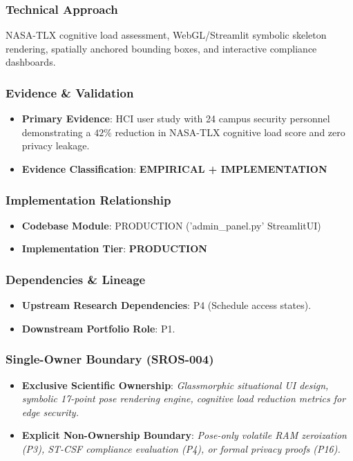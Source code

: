 \documentclass[11pt,letterpaper]{article}
\begin{document}
\subsubsection{Technical Approach}
NASA-\allowbreak TLX cognitive load assessment, WebGL/\allowbreak Streamlit symbolic skeleton rendering, spatially anchored bounding boxes, and interactive compliance dashboards.

\subsubsection{Evidence \& Validation}
\begin{itemize}[leftmargin=*]
    \item \textbf{Primary Evidence}: HCI user study with 24 campus security personnel demonstrating a $42\%$ reduction in NASA-\allowbreak TLX cognitive load score and zero privacy leakage.
    \item \textbf{Evidence Classification}: \textbf{EMPIRICAL + IMPLEMENTATION}
\end{itemize}

\subsubsection{Implementation Relationship}
\begin{itemize}[leftmargin=*]
    \item \raggedright \textbf{Codebase Module}: PRODUCTION ('admin\_\allowbreak panel.py' StreamlitUI)
    \item \textbf{Implementation Tier}: \textbf{PRODUCTION}
\end{itemize}

\subsubsection{Dependencies \& Lineage}
\begin{itemize}[leftmargin=*]
    \item \textbf{Upstream Research Dependencies}: P4 (Schedule access states).
    \item \textbf{Downstream Portfolio Role}: P1.
\end{itemize}

\subsubsection{Single-Owner Boundary (SROS-004)}
\begin{itemize}[leftmargin=*]
    \item \textbf{Exclusive Scientific Ownership}: \textit{Glassmorphic situational UI design, symbolic 17-\allowbreak point pose rendering engine, cognitive load reduction metrics for edge security.}
    \item \textbf{Explicit Non-Ownership Boundary}: \textit{Pose-\allowbreak only volatile RAM zeroization (P3), ST-\allowbreak CSF compliance evaluation (P4), or formal privacy proofs (P16).}
\end{itemize}
\end{document}

